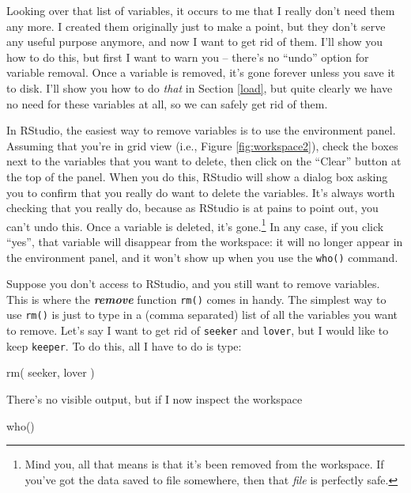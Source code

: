 \documentclass[
]{book}
\newenvironment{Shaded}{\begin{snugshade}}{\end{snugshade}}
\newcommand{\FunctionTok}[1]{\textcolor[rgb]{0.00,0.00,0.00}{#1}}
\newcommand{\NormalTok}[1]{#1}
\begin{document}
Looking over that list of variables, it occurs to me that I really don't need them any more. I created them originally just to make a point, but they don't serve any useful purpose anymore, and now I want to get rid of them. I'll show you how to do this, but first I want to warn you -- there's no ``undo'' option for variable removal. Once a variable is removed, it's gone forever unless you save it to disk. I'll show you how to do \emph{that} in Section \ref{load}, but quite clearly we have no need for these variables at all, so we can safely get rid of them.

In RStudio, the easiest way to remove variables is to use the environment panel. Assuming that you're in grid view (i.e., Figure \ref{fig:workspace2}), check the boxes next to the variables that you want to delete, then click on the ``Clear'' button at the top of the panel. When you do this, RStudio will show a dialog box asking you to confirm that you really do want to delete the variables. It's always worth checking that you really do, because as RStudio is at pains to point out, you can't undo this. Once a variable is deleted, it's gone.\footnote{Mind you, all that means is that it's been removed from the workspace. If you've got the data saved to file somewhere, then that \emph{file} is perfectly safe.} In any case, if you click ``yes'', that variable will disappear from the workspace: it will no longer appear in the environment panel, and it won't show up when you use the \texttt{who()} command.

Suppose you don't access to RStudio, and you still want to remove variables. This is where the \textbf{\emph{remove}} function \texttt{rm()} comes in handy. The simplest way to use \texttt{rm()} is just to type in a (comma separated) list of all the variables you want to remove. Let's say I want to get rid of \texttt{seeker} and \texttt{lover}, but I would like to keep \texttt{keeper}. To do this, all I have to do is type:

\begin{Shaded}
\begin{Highlighting}[]
\FunctionTok{rm}\NormalTok{( seeker, lover )}
\end{Highlighting}
\end{Shaded}

There's no visible output, but if I now inspect the workspace

\begin{Shaded}
\begin{Highlighting}[]
\FunctionTok{who}\NormalTok{()}
\end{Highlighting}
\end{Shaded}
\end{document}
